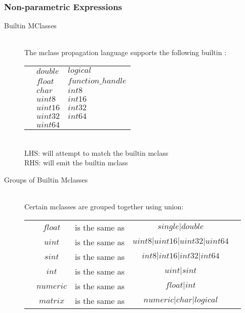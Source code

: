 \newpage
\subsubsection{Non-parametric Expressions}
\begin{description}
\item[ Builtin MClasses] \hfill \\
The mclass propagation language supports the following builtin :
\vspace{.1cm} \\
\begin{tabular}{ p{.3in} p{1in} p{1in} }
&$double$ & $logical$\\                   
&$float$  & $function\_handle$\\
&$char$   & $int8$   \\ 
&$uint8$  & $int16$  \\
&$uint16$ & $int32$  \\
&$uint32$ & $int64$  \\
&$uint64$ & \\
\end{tabular} \vspace{.1cm} 
\\
  LHS: will attempt to match the builtin mclass \\
  RHS: will emit the builtin mclass

\item[ Groups of Builtin Mclasses] \hfill \\
  Certain mclasses are grouped together using union:\\
\begin{tabular}{p{.2in} c c c c}
&$float  $ &  is the same as &$single|double$ \\
&$uint   $ &  is the same as &$uint8|uint16|uint32|uint64$ \\
&$sint   $ &  is the same as &$int8|int16|int32|int64$ \\
&$int    $ &  is the same as &$uint|sint$ \\
&$numeric$ &  is the same as &$float|int$ \\
&$matrix $ &  is the same as &$numeric|char|logical$ \\
\end{tabular}


\end{description}
